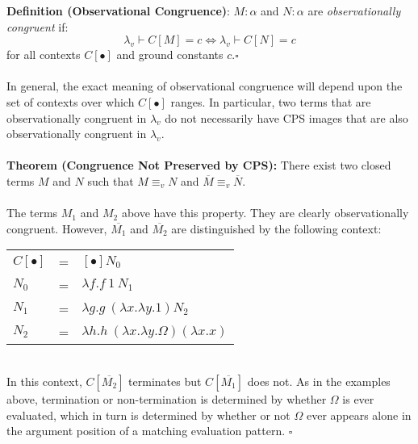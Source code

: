 \documentclass[a4paper,10pt]{article}
\begin{document}
\textbf{Definition (Observational Congruence)}: $M : \alpha$ and $N : \alpha$ are
\emph{observationally congruent} if:\\
\[
 \lambda_v \vdash C[M] = c \iff \lambda_v \vdash C[N] = c
\]
for all contexts $C[\bullet]$ and ground constants $c$.$\square$\\
\\
In general, the exact meaning of observational congruence will depend upon the set of contexts over
which $C[\bullet]$ ranges.  In particular, two terms that are observationally congruent in $\lambda_v$
do not necessarily have CPS images that are also observationally congruent in $\lambda_v$.\\
\\
\textbf{Theorem (Congruence Not Preserved by CPS):} There exist two closed terms $M$ and $N$ such that
$M \equiv_v N$ and $\overline{M} \equiv_v \overline{N}$.\\
\\
The terms $M_1$ and $M_2$ above have this property.  They are clearly observationally congruent.
However, $\overline{M_1}$ and $\overline{M_2}$ are distinguished by the following context:\\
\begin{tabular}[t]{lll}
 $C[\bullet]$ &=& $[\bullet] N_0$\\
$N_0$ &=& $\lambda f . f\ 1\ N_1$\\
$N_1$ &=& $\lambda g . g\ (\lambda x . \lambda y. 1) N_2$\\
$N_2$ &=& $\lambda h . h\ (\lambda x . \lambda y. \Omega) (\lambda x . x)$\\
\end{tabular}
\\
In this context, $C[\overline{M_2}]$ terminates but $C[\overline{M_1}]$ does not.  As in the examples
above, termination or non-termination is determined by whether $\Omega$ is ever evaluated, which
in turn is determined by whether or not $\Omega$ ever appears alone in the argument position of a
matching evaluation pattern. $\square$\\
\end{document}
